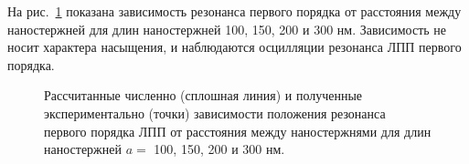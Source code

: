 На рис.~\ref{img:1res} показана зависимость резонанса первого порядка от расстояния между наностержней для длин наностержней 100, 150, 200 и 300 нм. Зависимость не носит характера насыщения, и наблюдаются осцилляции резонанса ЛПП первого порядка. 
\begin{figure}[t]
\caption{Рассчитанные численно (сплошная линия) и полученные экспериментально (точки) зависимости положения резонанса первого порядка ЛПП от расстояния между наностержнями для длин наностержней $ a = $ 100, 150, 200 и 300 нм.}
\label{img:1res}
\end{figure}

